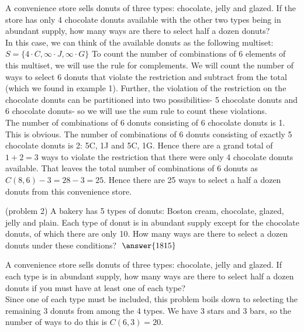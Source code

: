 \documentclass[handout]{ximera}
\begin{document}
 

\begin{example}[example 2]
A convenience store sells donuts of three types: chocolate, jelly and glazed.  If the store has only 4 chocolate donuts available with the other two types being in abundant supply, how many ways are there to select half a dozen donuts?\\
In this case, we can think of the available donuts as the following multiset: 
$S = \{4\cdot C, \infty \cdot J, \infty \cdot G\}$ To count the number of combinations of 6 elements of this multiset, we will use the rule for complements. We will count the number of ways to select 6 donuts that violate the restriction and subtract from the total (which we found in example 1).  Further, the violation of the restriction on the chocolate donuts can be partitioned into two possibilities- 5 chocolate donuts and 6 chocolate donuts- so we will use the sum rule to count these violations.\\
The number of combinations of 6 donuts consisting of 6 chocolate donuts is 1. This is obvious.  The number of combinations of 6 donuts consisting of exactly 5 chocolate donuts is 2: 5C, 1J and 5C, 1G.  Hence there are a grand total of $1+2 =3$
ways to violate the restriction that there were only 4 chocolate donuts available.  That leaves the total number of combinations of 6 donuts as $C(8,6) -3 = 28 - 3 = 25$.
Hence there are 25 ways to select a half a dozen donuts from this convenience store.
\end{example}


\begin{problem}(problem 2)
A bakery has 5 types of donuts: Boston cream, chocolate, glazed, jelly and plain.
Each type of donut is in abundant supply except for the chocolate donuts, of which there are only 10. 
How many ways are there to select a dozen donuts under these conditions? $\; \answer{1815}$
\end{problem}


\begin{example}[example 3]
A convenience store sells donuts of three types: chocolate, jelly and glazed.  
If each type is in abundant supply, how many ways are there to select half a 
dozen donuts if you must have at least one of each type?\\
Since one of each type must be included, this problem boils down to selecting the 
remaining 3 donuts from among the 4 types. We have 3 stars and 3 bars, so
the number of ways to do this is $C(6, 3) = 20$.
\end{example}
\end{document}
